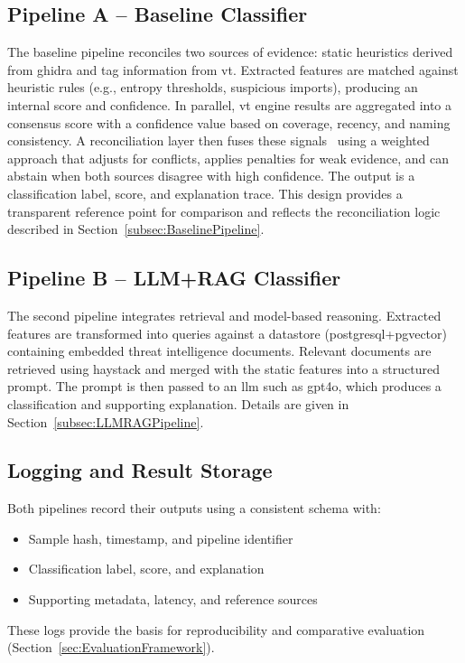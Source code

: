 \subsection{Pipeline A -- Baseline Classifier}\label{subsec:StaticTagBasedClassification}
The baseline pipeline reconciles two sources of evidence: static heuristics derived from
\gls{ghidra} and tag information from \gls{vt}. Extracted features are matched against heuristic
rules (e.g., entropy thresholds, suspicious imports), producing an internal score and confidence.
In parallel, \gls{vt} engine results are aggregated into a consensus score with a confidence value
based on coverage, recency, and naming consistency. A reconciliation layer then fuses these
signals~\cite{rexisReconciliationGuide} using a weighted approach that adjusts for conflicts,
applies penalties for weak evidence, and can abstain when both sources disagree with high
confidence. The output is a classification label, score, and explanation trace. This design
provides a transparent reference point for comparison and reflects the reconciliation logic
described in Section~\ref{subsec:BaselinePipeline}.

\subsection{Pipeline B -- LLM+RAG Classifier}\label{subsec:RAGBasedClassification}
The second pipeline integrates retrieval and model-based reasoning. Extracted features are
transformed into queries against a datastore (\gls{postgresql}+\gls{pgvector}) containing embedded
threat intelligence documents. Relevant documents are retrieved using \gls{haystack} and merged
with the static features into a structured prompt. The prompt is then passed to an \gls{llm} such
as \gls{gpt4o}, which produces a classification and supporting explanation. Details are given in
Section~\ref{subsec:LLMRAGPipeline}.

\subsection{Logging and Result Storage}\label{subsec:LoggingAndResult}
Both pipelines record their outputs using a consistent schema with:
\begin{itemize}
      \item Sample hash, timestamp, and pipeline identifier
      \item Classification label, score, and explanation
      \item Supporting metadata, latency, and reference sources
\end{itemize}
These logs provide the basis for reproducibility and comparative evaluation (Section~\ref{sec:EvaluationFramework}).

